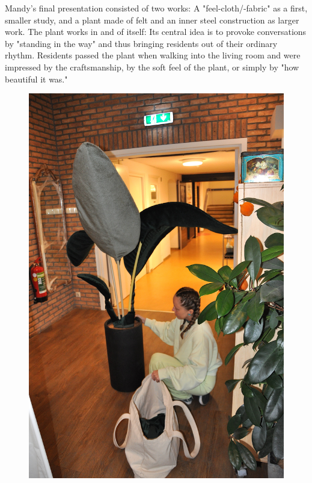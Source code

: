 \documentclass[authordate, empirical,issue]{jote-new-article}
\begin{document}
{	Mandy's final presentation consisted of two works: A "feel-cloth/-fabric" as a first, smaller study, and a plant made of felt and an inner steel construction as larger work. The plant works in and of itself: Its central idea is to provoke conversations by "standing in the way" and thus bringing residents out of their ordinary rhythm. Residents passed the plant when walking into the living room and were impressed by the craftsmanship, by the soft feel of the plant, or simply by "how beautiful it was."







	\begin{figure}
		\includegraphics[width=\linewidth]{media/fig2.jpeg}


\end{figure}}
\end{document}
